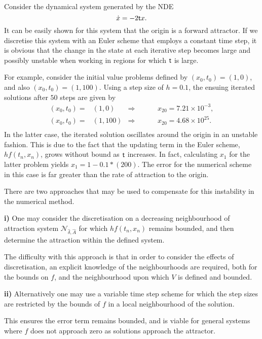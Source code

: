 \begin{eg}
Consider the dynamical system generated by the NDE
\[ \dot{x} = -2 \mathsf{\mathsf{t}} x. \]
It can be easily shown for this system that the origin is a
forward attractor. If we discretise this system with an Euler scheme
that employs a constant time step, it is obvious that the change in the state
at each iterative step becomes large and possibly unstable when working in
regions for which $ \mathsf{\mathsf{t}}$ is large.

For example, consider the initial value problems defined by $(x_0, t_0) =
(1,0)$, and also $(x_0, t_0) = (1,100)$. Using a step
size of $h = 0.1$, the ensuing iterated solutions after $50$ steps
are given by
\begin{align*}
     (x_0, t_0) = &(1,0) & \Rightarrow \hspace{1cm} &x_{20} = 7.21
                  \times 10^{-3}, \\
     (x_0, t_0) = &(1,100) & \Rightarrow \hspace{1cm} &x_{20} = 4.68
                  \times 10^{25}. \\
\end{align*}
In the latter case, the iterated solution oscillates around the
origin in an unstable fashion. This is due to the fact that the
updating term in the Euler scheme, $h f(t_n, x_n)$, grows
without bound as $ \mathsf{\mathsf{t}}$ increases. In fact, calculating $x_1$ for the
latter problem yields $x_1 = 1 - 0.1*(200)$. The error for the
numerical scheme in this case is far greater than the rate of
attraction to the origin.
\end{eg}

There are two approaches that may be used to compensate for this instability in
the numerical method.

\textbf{i)} One may consider the discretisation on a decreasing
neighbourhood of attraction system $\mathcal{N}_{\hat{\delta},
\hat{A}}$ for which $h f(t_n, x_n)$ remains bounded, and then
determine the attraction within the defined system.

The difficulty with this approach is that in order to consider the
effects of discretisation, an explicit knowledge of the
neighbourhoods are required, both for the bounds on $f$, and the
neighbourhood upon which $V$ is defined and bounded.

\textbf{ii)} Alternatively one may use a variable time step scheme
for which the step sizes are restricted by the bounds of $f$ in a
local neighbourhood of the solution.

This ensures the error term remains bounded, and is viable for
general systems where $f$ does not approach zero as
solutions approach the attractor.

